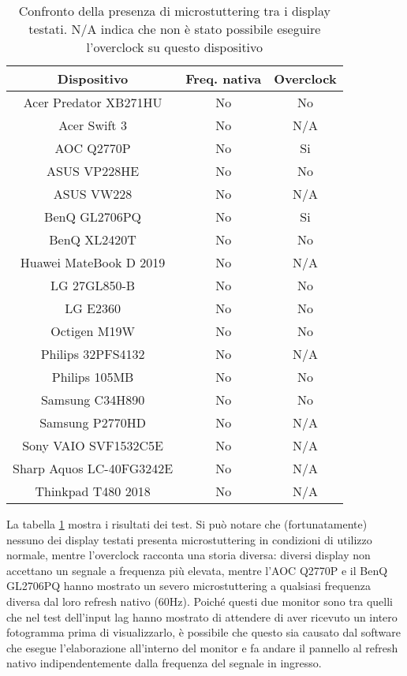 \begin{table}[h!]
	\centering
	\begin{tabular}{|c|c|c|} 
		\hline
		\textbf{Dispositivo} & \textbf{Freq. nativa} & \textbf{Overclock}  \\ 
		\hline
		Acer Predator XB271HU & No & No \\ \hline
		Acer Swift 3 & No & N/A \\ \hline
		AOC Q2770P & No & Si \\ \hline
		ASUS VP228HE & No & No \\ \hline
		ASUS VW228 & No & N/A \\ \hline
		BenQ GL2706PQ & No & Si \\ \hline
		BenQ XL2420T & No & No \\ \hline
		Huawei MateBook D 2019 & No & N/A \\ \hline
		LG 27GL850-B & No & No \\ \hline
		LG E2360 & No & No \\ \hline
		Octigen M19W & No & No \\ \hline
		Philips 32PFS4132 & No & N/A \\ \hline
		Philips 105MB & No & No \\ \hline
		Samsung C34H890 & No & No \\ \hline
		Samsung P2770HD & No & N/A \\ \hline
		Sony VAIO SVF1532C5E & No & N/A \\ \hline
		Sharp Aquos LC-40FG3242E & No & N/A \\ \hline
		Thinkpad T480 2018 & No & N/A \\ \hline
	\end{tabular}
	\caption{\label{tab:microstuttering_list}Confronto della presenza di microstuttering tra i display testati. N/A indica che non è stato possibile eseguire l'overclock su questo dispositivo}
\end{table}

La tabella \ref{tab:microstuttering_list} mostra i risultati dei test. Si può notare che (fortunatamente) nessuno dei display testati presenta microstuttering in condizioni di utilizzo normale, mentre l'overclock racconta una storia diversa: diversi display non accettano un segnale a frequenza più elevata, mentre l'AOC Q2770P e il BenQ GL2706PQ hanno mostrato un severo microstuttering a qualsiasi frequenza diversa dal loro refresh nativo (60Hz). Poiché questi due monitor sono tra quelli che nel test dell'input lag hanno mostrato di attendere di aver ricevuto un intero fotogramma prima di visualizzarlo, è possibile che questo sia causato dal software che esegue l'elaborazione all'interno del monitor e fa andare il pannello al refresh nativo indipendentemente dalla frequenza del segnale in ingresso.

